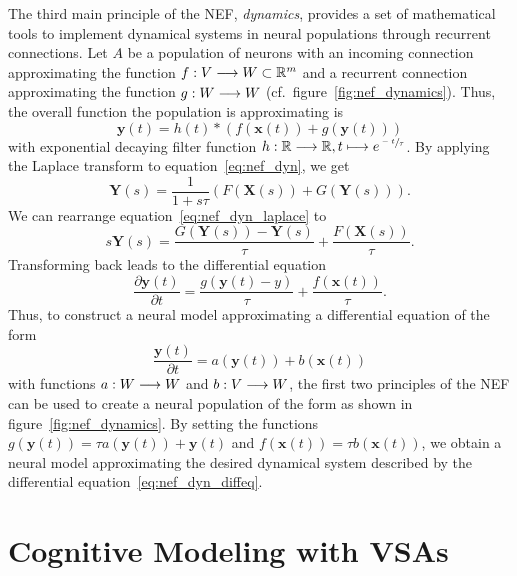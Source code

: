 The third main principle of the \ac{NEF}, \emph{dynamics}, provides a set of mathematical tools to implement dynamical systems in neural populations through recurrent connections.
Let $A$ be a population of neurons with an incoming connection approximating the function $f: V \longrightarrow W \subset \mathbb{R}^{m}$ and a recurrent connection approximating the function $g: W \longrightarrow W$ (cf.\ figure~\ref{fig:nef_dynamics}).
Thus, the overall function the population is approximating is
\begin{equation}
\mathbf{y}(t) = h(t) \ast \left(f(\mathbf{x}(t)) + g(\mathbf{y}(t))\right)
\label{eq:nef_dyn}
\end{equation}
with exponential decaying filter function $h: \mathbb{R} \longrightarrow \mathbb{R}, t \longmapsto e^{\sfrac{-t}{\tau}}$.
By applying the Laplace transform to equation~\eqref{eq:nef_dyn}, we get
\begin{equation}
\label{eq:nef_dyn_laplace}
\mathbf{Y}(s) = \frac{1}{1 + s\tau}\left(F(\mathbf{X}(s)) + G(\mathbf{Y}(s))\right).
\end{equation}
We can rearrange equation~\eqref{eq:nef_dyn_laplace} to
\begin{equation}
s\mathbf{Y}(s) = \frac{G(\mathbf{Y}(s))-\mathbf{Y}(s)}{\tau} + \frac{F(\mathbf{X}(s))}{\tau}.
\end{equation}
Transforming back leads to the differential equation
\begin{equation}
\frac{\partial \mathbf{y}(t)}{\partial t} = \frac{g(\mathbf{y}(t)-y)}{\tau} + \frac{f(\mathbf{x}(t))}{\tau}.
\end{equation}
Thus, to construct a neural model approximating a differential equation of the form
\begin{equation}
\frac{\mathbf{y}(t)}{\partial t} = a(\mathbf{y}(t)) + b(\mathbf{x}(t))
\label{eq:nef_dyn_diffeq}
\end{equation}
with functions $a: W \longrightarrow W$ and $b: V \longrightarrow W$, the first two principles of the \ac{NEF} can be used to create a neural population of the form as shown in figure~\ref{fig:nef_dynamics}.
By setting the functions $g(\mathbf{y}(t))=\tau a(\mathbf{y}(t)) + \mathbf{y}(t)$ and $f(\mathbf{x}(t))=\tau b(\mathbf{x}(t))$, we obtain a neural model approximating the desired dynamical system described by the differential equation~\eqref{eq:nef_dyn_diffeq}.

\section{Cognitive Modeling with \aclp{VSA}}%
\label{sec:cognitive_modelling_with_vsa}

